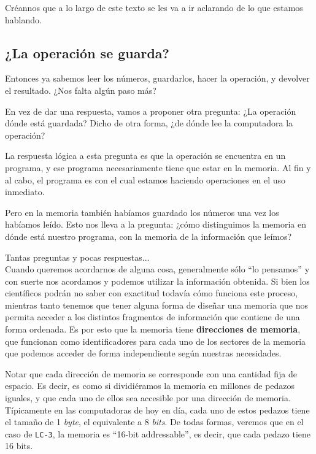 \documentclass[a4paper, titlepage]{report}
\begin{document}
	Créannos que a lo largo de este texto se les va a ir aclarando de lo que estamos hablando.
	
	\subsection{¿La operación se guarda?}
	\label{sec:isa-memory}
	
	Entonces ya sabemos leer los números, guardarlos, hacer la operación, y devolver el resultado. ¿Nos falta algún paso más?
	
	En vez de dar una respuesta, vamos a proponer otra pregunta: ¿La operación dónde está guardada? Dicho de otra forma, ¿de dónde lee la computadora la operación?
	
	La respuesta lógica a esta pregunta es que la operación se encuentra en un programa, y ese programa necesariamente tiene que estar en la memoria. Al fin y al cabo, el programa es con el cual estamos haciendo operaciones en el uso inmediato.
	
	Pero en la memoria también habíamos guardado los números una vez los habíamos leído. Esto nos lleva a la pregunta: ¿cómo distinguimos la memoria en dónde está nuestro programa, con la memoria de la información que leímos?
	
	Tantas preguntas y pocas respuestas...\\
	
	Cuando queremos acordarnos de alguna cosa, generalmente sólo ``lo pensamos'' y con suerte nos acordamos y podemos utilizar la información obtenida. Si bien los científicos podrán no saber con exactitud todavía cómo funciona este proceso, mientras tanto tenemos que tener alguna forma de diseñar una memoria que nos permita acceder a los distintos fragmentos de información que contiene de una forma ordenada. Es por esto que la memoria tiene \textbf{direcciones de memoria}, que funcionan como identificadores para cada uno de los sectores de la memoria que podemos acceder de forma independiente según nuestras necesidades. 
	
	Notar que cada dirección de memoria se corresponde con una cantidad fija de espacio. Es decir, es como si dividiéramos la memoria en millones de pedazos iguales, y que cada uno de ellos sea accesible por una dirección de memoria. Típicamente en las computadoras de hoy en día, cada uno de estos pedazos tiene el tamaño de 1 \textit{byte}, el equivalente a 8 \textit{bits}. De todas formas, veremos que en el caso de \texttt{LC-3}, la memoria es ``16-bit addressable'', es decir, que cada pedazo tiene 16 bits.
		
\end{document}
